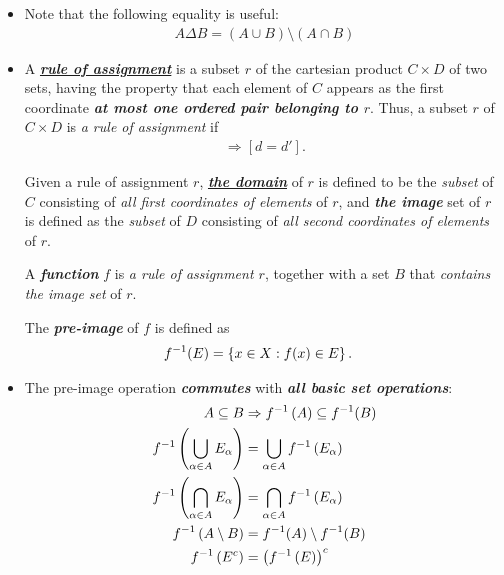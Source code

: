 \documentclass[11pt]{article}
\begin{document}
\begin{itemize}
\item \begin{remark}
Note that the following equality is useful:
\begin{align*}
A \Delta B = (A \cup B) \setminus (A \cap B)
\end{align*}
\end{remark}



\item \begin{definition}
A \underline{\emph{\textbf{rule of assignment}}} is a subset $r$ of the cartesian product $C \times D$ of two sets, having the property that each element of $C$ appears as the first coordinate  \emph{\textbf{at most one ordered pair belonging to $r$}}. Thus, a subset $r$ of $C \times D$ is \emph{a rule of assignment} if
\begin{align*}
[(c, d) \in r\text{ and }(c, d') \in r] \Rightarrow [d = d'].
\end{align*}

Given a rule of assignment $r$, \underline{\emph{\textbf{the domain}}} of $r$ is defined to be the \emph{subset} of $C$ consisting of \emph{all first coordinates of elements} of $r$, and \emph{\textbf{the image}} set of $r$ is defined as the \emph{subset} of $D$ consisting of \emph{all second coordinates of elements} of $r$.

A \emph{\textbf{function}} $f$ is \emph{a rule of assignment $r$}, together with a set $B$ that \emph{contains the image set} of $r$.

The \emph{\textbf{pre-image}} of $f$ is defined as
\begin{align*}
f^{-1}(E) &= \left\{x \in X: f(x) \in E\right\}.
\end{align*}
\end{definition}



\item \begin{remark}
The pre-image operation \emph{\textbf{commutes}} with \emph{\textbf{all basic set operations}}:
\begin{align*}
A \subseteq B & \Rightarrow f^{-1}\left(A\right) \subseteq f^{-1}(B) \\
f^{-1}\left(\bigcup_{\alpha \in A}E_{\alpha}\right) &= \bigcup_{\alpha \in A}f^{-1}\left(E_{\alpha}\right)\\
f^{-1}\left(\bigcap_{\alpha \in A}E_{\alpha}\right) &= \bigcap_{\alpha \in A}f^{-1}\left(E_{\alpha}\right)\\
f^{-1}\left(A \setminus B\right) &= f^{-1}(A) \setminus f^{-1}(B) \\
f^{-1}\left(E^c\right) &= \left(f^{-1}\left(E\right)\right)^c 
\end{align*}
\end{remark}



\end{itemize}
\end{document}
